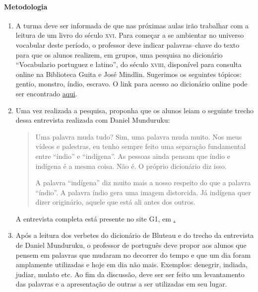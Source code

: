 \documentclass[12pt]{extarticle}
\begin{document}
\paragraph{Metodologia}

\begin{enumerate}

\item 
A turma deve ser informada de que nas próximas aulas irão trabalhar
com a leitura de um livro do século \textsc{xvi}. Para começar a se
ambientar no universo vocabular deste período, o professor deve indicar
palavras--chave do texto para que os alunos realizem, em grupos, uma 
pesquisa no dicionário ``Vocabulario portuguez e latino'', do século 
\textsc{xviii}, disponível para consulta online na Biblioteca Guita e 
José Mindlin. Sugerimos os seguintes tópicos: gentio, monstro, índio, 
escravo.
O link para acesso ao dicionário online pode ser encontrado \href{http://dicionarios.bbm.usp.br/pt-br/dicionario/edicao/1}{aqui}.

\item
Uma vez realizada a pesquisa, proponha que os alunos leiam o seguinte 
trecho dessa entrevista realizada com Daniel Munduruku:

\begin{quote} Uma palavra muda tudo? Sim, uma palavra muda muito. Nos 
meus vídeos e palestras, eu tenho sempre feito uma separação fundamental 
entre ``índio'' e ``indígena''. As pessoas ainda pensam que índio e 
indígena é a mesma coisa. Não é. O próprio dicionário diz isso.

A palavra ``indígena'' diz muito mais a nosso respeito do que a palavra 
``índio''. A palavra índio gera uma imagem distorcida. Já indígena quer 
dizer originário, aquele que está ali antes dos outros.\end{quote}

A entrevista completa está presente no site G1, em \href{https://g1.globo.com/educacao/noticia/2019/04/19/dia-do-indio-e-data-folclorica-e-preconceituosa-diz-escritor-indigena-daniel-munduruku.ghtml}. 

\item
Após a leitura dos verbetes do dicionário de Bluteau e do trecho da 
entrevista de Daniel Munduruku, o professor de português deve propor 
aos alunos que pensem em palavras que mudaram no decorrer do tempo e que
um dia foram amplamente utilizadas e hoje em dia não mais. Exemplos: 
denegrir, indiada, judiar, mulato etc. Ao fim da discussão, deve ser
ser feito um levantamento das palavras e a apresentação de outras a ser
utilizadas em seu lugar. 

\end{enumerate} 
\end{document}

